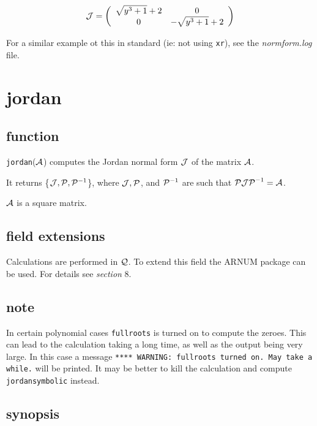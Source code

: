 \vspace{0.2in}
\begin{displaymath}
{\cal J} = \left( \begin{array}{cc} \sqrt{y^3+1} + 2 & 0 \\ 0 &
-\sqrt{y^3+1} + 2 \end{array} \right)
\end{displaymath}

\vspace{0.2in}
For a similar example ot this in standard {\REDUCE} (ie: not using
{\tt xr}), see the {\it normform.log} file.

\vspace{0.5in}

\section{jordan}

\subsection{function}

{\tt jordan}(${\cal A}$) computes the Jordan normal form
${\cal J}$ of the matrix ${\cal A}$.

It returns \{${\cal J}, {\cal P}, {\cal P}^{-1}$\}, where
${\cal J}, {\cal P}$, and ${\cal P}^{-1}$ are such that ${\cal P J P}^
{-1} = {\cal A}$.

${\cal A}$ is a square matrix.

\subsection{field extensions}

Calculations are performed in ${\cal Q}$. To extend this field the
{\small ARNUM} package can be used. For details see {\it section} 8.

\subsection{note}
In certain polynomial cases {\tt fullroots} is turned on to compute the
zeroes. This can lead to the calculation taking a long time, as well as
the output being very large. In this case a message {\tt ***** WARNING:
fullroots turned on. May take a while.} will be printed. It may be
better to kill the calculation and compute {\tt jordansymbolic} instead.

\subsection{synopsis}

